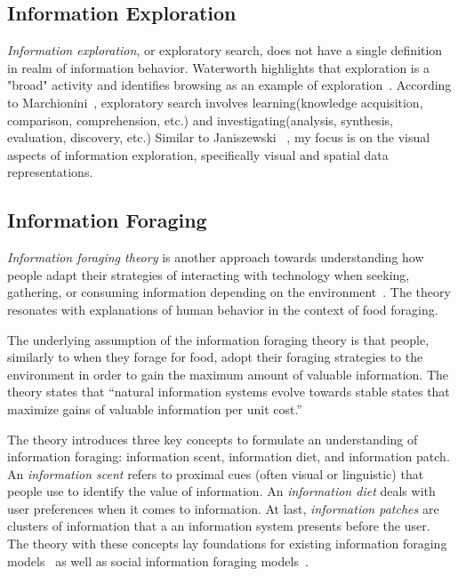 {{\subsection{Information Exploration}
\textit{Information exploration}, or exploratory search, does not have a single definition in realm of information behavior. Waterworth highlights that exploration is a "broad" activity and identifies browsing as an example of exploration~\citep{waterworth1991model}. According to Marchionini~\cite{marchionini2006exploratory}, exploratory search involves learning(knowledge acquisition, comparison, comprehension, etc.) and investigating(analysis, synthesis, evaluation, discovery, etc.) Similar to Janiszewski ~\cite{janiszewski1998influence}, my focus is on the visual aspects of information exploration, specifically visual and spatial data representations.
}
{\subsection{Information Foraging}
\textit{Information foraging theory} is another approach towards understanding how people adapt their strategies of interacting with technology when seeking, gathering, or consuming information depending on the environment~\cite{pirolli1999information}. The theory resonates with explanations of human behavior in the context of food foraging. 

The underlying assumption of the information foraging theory is that people, similarly to when they forage for food, adopt their foraging strategies to the environment in order to gain the maximum amount of valuable information. The theory states that ``natural information systems evolve towards stable states that maximize gains of valuable information per unit cost.''

The theory introduces three key concepts to formulate an understanding of information foraging: information scent, information diet, and information patch. An \textit{information scent} refers to proximal cues (often visual or linguistic) that people use to identify the value of information. An \textit{information diet} deals with user preferences when it comes to information. At last, \textit{information patches} are clusters of information that a an information system presents before the user. The theory with these concepts lay foundations for existing information foraging models~\cite{fu2007snif,kitajima2000comprehension} as well as social information foraging models~\cite{pirolli2009elementary,fu2008microstructures}.  
}

}
